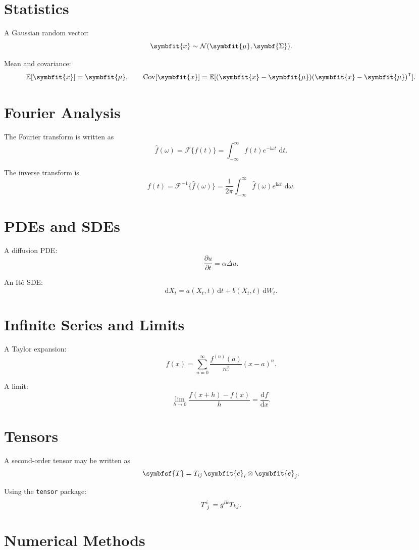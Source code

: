 \documentclass[11pt,twocolumn]{article}
\newcommand{\vct}[1]{\symbfit{#1}}   %
\newcommand{\mat}[1]{\symbf{#1}}     %
\newcommand{\ten}[1]{\symbfsf{#1}}   %
\newcommand{\T}{^{\mathsf{T}}}
\newcommand{\dd}{\,\mathrm{d}}
\newcommand{\laplace}{\Delta}
\newcommand{\dv}[2]{\frac{\mathrm{d} #1}{\mathrm{d} #2}}
\newcommand{\pdv}[2]{\frac{\partial #1}{\partial #2}}
\newcommand{\ii}{\mathrm{i}}
\newcommand{\FT}{\mathcal{F}}
\newcommand{\IFT}{\mathcal{F}^{-1}}
\newcommand{\fourier}[1]{\widehat{#1}}
\newcommand{\E}{\mathbb{E}}
\newcommand{\Cov}{\operatorname{Cov}}
\newcommand{\Normal}{\mathcal{N}}
\newcommand{\ito}{\mathrm{d}}
\begin{document}
\section{Statistics}

A Gaussian random vector:
\[
\vct{x} \sim \Normal(\vct{\mu}, \mat{\Sigma}).
\]

Mean and covariance:
\[
\E[\vct{x}] = \vct{\mu},
\qquad
\Cov[\vct{x}] = \E[(\vct{x}-\vct{\mu})(\vct{x}-\vct{\mu})\T].
\]

\section{Fourier Analysis}

The Fourier transform is written as
\[
\fourier{f}(\omega)
=
\FT\{f(t)\}
=
\int_{-\infty}^{\infty}
f(t)e^{-\ii \omega t}\,\dd t.
\]

The inverse transform is
\[
f(t)
=
\IFT\{\fourier{f}(\omega)\}
=
\frac{1}{2\pi}
\int_{-\infty}^{\infty}
\fourier{f}(\omega)e^{\ii \omega t}\,\dd \omega.
\]

\section{PDEs and SDEs}

A diffusion PDE:
\[
\pdv{u}{t}
=
\alpha \laplace u.
\]

An Itô SDE:
\[
\ito X_t
=
a(X_t,t)\,\ito t
+
b(X_t,t)\,\ito W_t.
\]

\section{Infinite Series and Limits}

A Taylor expansion:
\[
f(x)
=
\sum_{n=0}^{\infty}
\frac{f^{(n)}(a)}{n!}(x-a)^n.
\]

A limit:
\[
\lim_{h \to 0}
\frac{f(x+h)-f(x)}{h}
=
\dv{f}{x}.
\]

\section{Tensors}

A second-order tensor may be written as
\[
\ten{T}
=
T_{ij}\,\vct{e}_i \otimes \vct{e}_j.
\]

Using the \texttt{tensor} package:
\[
\tensor{T}{^i_j}
=
g^{ik}T_{kj}.
\]

\section{Numerical Methods}
\end{document}
